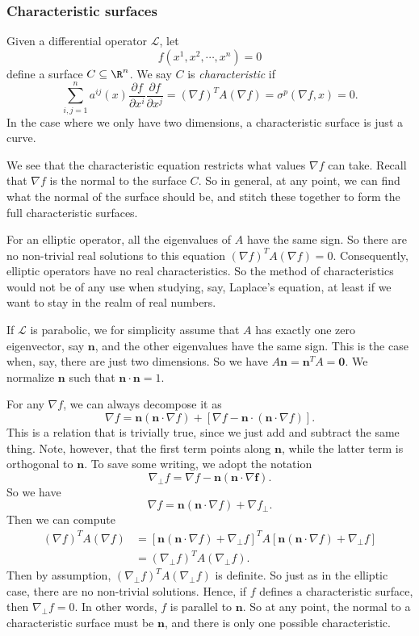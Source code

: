 \documentclass[a4paper]{article}
\begin{document}
\subsubsection*{Characteristic surfaces}
\begin{defi}
  Given a differential operator $\mathcal{L}$, let
  \[
    f(x^1, x^2, \cdots, x^n) = 0
  \]
  define a surface $C \subseteq \R^n$. We say $C$ is \emph{characteristic} if
  \[
    \sum_{i, j = 1}^n a^{ij}(x) \frac{\partial f}{\partial x^i} \frac{\partial f}{\partial x^j} = (\nabla f)^T A (\nabla f) = \sigma^p(\nabla f, x) = 0.
  \]
  In the case where we only have two dimensions, a characteristic surface is just a curve.
\end{defi}
We see that the characteristic equation restricts what values $\nabla f$ can take. Recall that $\nabla f$ is the normal to the surface $C$. So in general, at any point, we can find what the normal of the surface should be, and stitch these together to form the full characteristic surfaces.

For an elliptic operator, all the eigenvalues of $A$ have the same sign. So there are no non-trivial real solutions to this equation $(\nabla f)^T A (\nabla f) = 0$. Consequently, elliptic operators have no real characteristics. So the method of characteristics would not be of any use when studying, say, Laplace's equation, at least if we want to stay in the realm of real numbers.

If $\mathcal{L}$ is parabolic, we for simplicity assume that $A$ has exactly one zero eigenvector, say $\mathbf{n}$, and the other eigenvalues have the same sign. This is the case when, say, there are just two dimensions. So we have $A \mathbf{n} = \mathbf{n}^T A = \mathbf{0}$. We normalize $\mathbf{n}$ such that $\mathbf{n}\cdot \mathbf{n} = 1$.

For any $\nabla f$, we can always decompose it as
\[
  \nabla f = \mathbf{n} (\mathbf{n} \cdot \nabla f) + [\nabla f - \mathbf{n}\cdot (\mathbf{n}\cdot \nabla f)].
\]
This is a relation that is trivially true, since we just add and subtract the same thing. Note, however, that the first term points along $\mathbf{n}$, while the latter term is orthogonal to $\mathbf{n}$. To save some writing, we adopt the notation
\[
  \nabla_\perp f = \nabla f - \mathbf{n}(\mathbf{n} \cdot \nabla \mathbf{f}).
\]
So we have
\[
  \nabla f = \mathbf{n}(\mathbf{n}\cdot \nabla f) + \nabla f_\perp.
\]
Then we can compute
\begin{align*}
  (\nabla f)^T A(\nabla f) &= [\mathbf{n}(\mathbf{n}\cdot \nabla f) + \nabla_\perp f]^T A[\mathbf{n}(\mathbf{n}\cdot \nabla f) + \nabla_\perp f]\\
  &= (\nabla_\perp f)^T A(\nabla_\perp f).
\end{align*}
Then by assumption, $(\nabla_\perp f)^T A(\nabla_\perp f)$ is definite. So just as in the elliptic case, there are no non-trivial solutions. Hence, if $f$ defines a characteristic surface, then $\nabla_\perp f = 0$. In other words, $f$ is parallel to $\mathbf{n}$. So at any point, the normal to a characteristic surface must be $\mathbf{n}$, and there is only one possible characteristic.
\end{document}
